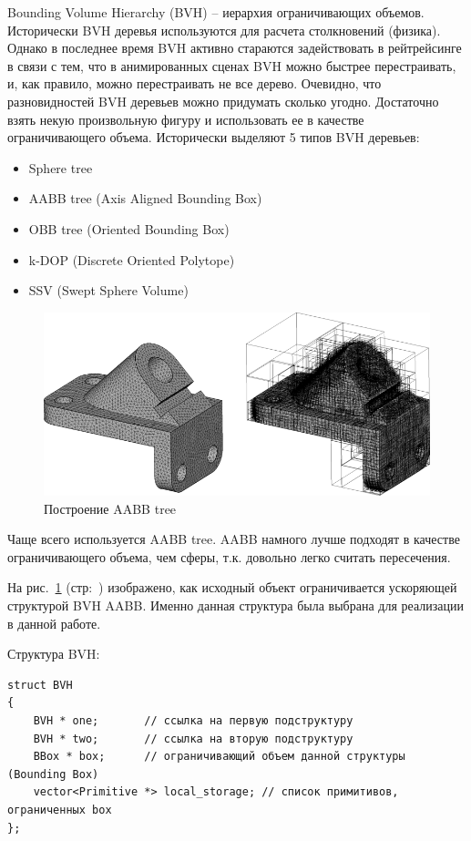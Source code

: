 \documentclass[12pt, a4paper, utf8]{article}
\begin{document}
Bounding Volume Hierarchy (BVH) -- иерархия ограничивающих объемов. Исторически BVH деревья используются для расчета столкновений (физика). Однако в последнее время BVH активно стараются задействовать в рейтрейсинге в связи с тем, что в анимированных сценах BVH можно быстрее перестраивать, и, как правило, можно перестраивать не все дерево.
Очевидно, что разновидностей BVH деревьев можно придумать сколько угодно. Достаточно взять некую произвольную фигуру и использовать ее в качестве ограничивающего объема. Исторически выделяют 5 типов BVH деревьев:
\begin{itemize}
\item Sphere tree
\item AABB tree (Axis Aligned Bounding Box)
\item OBB tree (Oriented Bounding Box)
\item k-DOP (Discrete Oriented Polytope)
\item SSV (Swept Sphere Volume)
\end{itemize}

\begin{figure}[h]
\centering
\includegraphics[width=\textwidth]{imgs/aabb.png} 
\caption{Построение AABB tree}\label{fig:aabb_tree}
\end{figure}

Чаще всего используется AABB tree. AABB намного лучше подходят в качестве ограничивающего объема, чем сферы, т.к. довольно легко считать пересечения. 

На рис.~\ref{fig:aabb_tree} (стр:~\pageref{fig:aabb_tree}) изображено, как исходный объект ограничивается ускоряющей структурой BVH AABB. Именно данная структура была выбрана для реализации в данной работе.

\noindent Структура BVH:~\begin{spacing}{0.9}
\begin{verbatim}
struct BVH
{
    BVH * one;       // ссылка на первую подструктуру
    BVH * two;       // ссылка на вторую подструктуру
    BBox * box;      // ограничивающий объем данной структуры (Bounding Box)
    vector<Primitive *> local_storage; // список примитивов, ограниченных box
};
\end{verbatim}
\end{spacing}~
\end{document}
